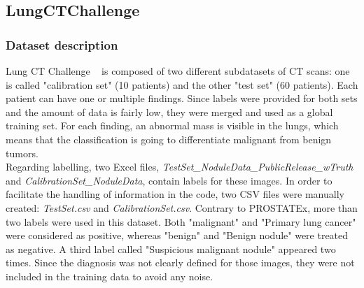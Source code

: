 \subsection{LungCTChallenge}
\label{sec:lungCTChallenge}
\subsubsection{Dataset description}
\setlength{\marginparwidth}{3cm}\leavevmode {}Lung CT Challenge ~\cite{12, 36, 38} is composed of two different subdatasets of CT scans: one is called "calibration set" (10 patients) and the other "test set" (60 patients). Each patient can have one or multiple findings. Since labels were provided for both sets and the amount of data is fairly low, they were merged and used as a global training set. For each finding, an abnormal mass is visible in the lungs, which means that the classification is going to differentiate malignant from benign tumors.\\
Regarding labelling, two Excel files, \textit{TestSet\_NoduleData\_PublicRelease\_wTruth} and \textit{CalibrationSet\_NoduleData}, contain labels for these images. In order to facilitate the handling of information in the code, two CSV files were manually created: \mbox{\textit{TestSet.csv}} and \textit{CalibrationSet.csv}.
Contrary to PROSTATEx, more than two labels were used in this dataset. Both "malignant" and "Primary lung cancer" were considered as positive, whereas "benign" and "Benign nodule" were treated as negative. A third label called "Suspicious malignant nodule" appeared two times. Since the diagnosis was not clearly defined for those images, they were not included in the training data to avoid any noise. 


